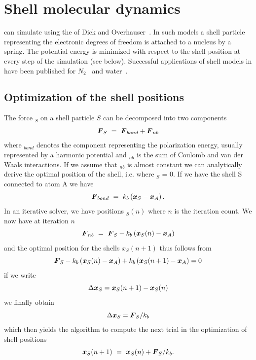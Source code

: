 \section{Shell molecular dynamics}
{\gromacs} can simulate  using the 
 of Dick and Overhauser~\cite{Dick58}. In such models
a shell particle representing the electronic degrees of freedom is
attached to a nucleus by a spring. The potential energy is minimized with
respect to the shell position  at every step of the simulation (see below).
Successful applications of shell models in {\gromacs} have been published
for $N_2$~\cite{Jordan95} and water~\cite{Maaren2001a}.

\subsection{Optimization of the shell positions}
The force $_S$ on a shell particle $S$ can be decomposed into two
components
\begin{equation}
\ve{F}_S ~=~ \ve{F}_{bond} + \ve{F}_{nb}
\end{equation}
where $_{bond}$ denotes the component representing the
polarization energy, usually represented by a harmonic potential and
$_{nb}$ is the sum of Coulomb and van der Waals interactions. If we
assume that $_{nb}$ is almost constant we can analytically derive the
optimal position of the shell, i.e. where $_S$ = 0. If we have the
shell S connected to atom A we have
\begin{equation}
\ve{F}_{bond} ~=~ k_b \left( \ve{x}_S - \ve{x}_A\right).
\end{equation}
In an iterative solver, we have positions $_S(n)$ where $n$ is
the iteration count. We now have at iteration $n$
\begin{equation}
\ve{F}_{nb} ~=~ \ve{F}_S - k_b \left( \ve{x}_S(n) - \ve{x}_A\right)
\end{equation}
and the optimal position for the shells $x_S(n+1)$ thus follows from
\begin{equation}
\ve{F}_S - k_b \left( \ve{x}_S(n) - \ve{x}_A\right) + k_b \left( \ve{x}_S(n+1) - \ve{x}_A\right) = 0
\end{equation}
if we write
\begin{equation}
\Delta \ve{x}_S = \ve{x}_S(n+1) - \ve{x}_S(n)
\end{equation}
we finally obtain
\begin{equation}
\Delta \ve{x}_S = \ve{F}_S/k_b
\end{equation}
which then yields the algorithm to compute the next trial in the optimization
of shell positions
\begin{equation}
\ve{x}_S(n+1) ~=~ \ve{x}_S(n) + \ve{F}_S/k_b.
\end{equation}

